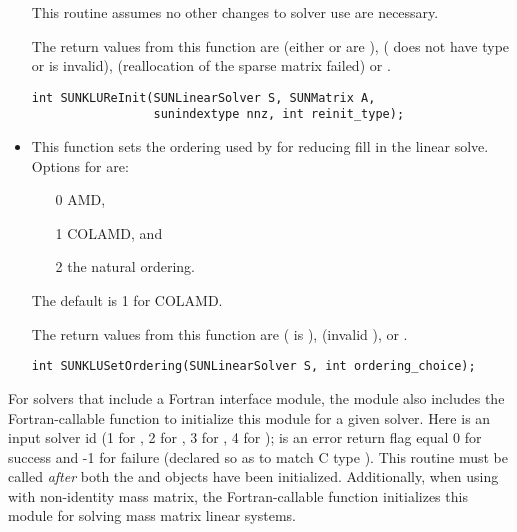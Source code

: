 \begin{itemize}
  This routine assumes no other changes to solver use are necessary.

  The return values from this function are 
  (either  or  are ), 
  ( does not have type  or
   is invalid),  (reallocation
  of the sparse matrix failed) or .
  
\begin{verbatim}
int SUNKLUReInit(SUNLinearSolver S, SUNMatrix A, 
                 sunindextype nnz, int reinit_type);
\end{verbatim}



\item {}

  This function sets the ordering used by {\klu} for reducing fill in
  the linear solve.  Options for  are:
  \begin{itemize}
  \item[0] AMD,
  \item[1] COLAMD, and
  \item[2] the natural ordering.
  \end{itemize}
  The default is 1 for COLAMD.

  The return values from this function are 
  ( is ), 
  (invalid ), or .
  
  \verb|int SUNKLUSetOrdering(SUNLinearSolver S, int ordering_choice);|

\end{itemize}
For solvers that include a Fortran interface module, the
{\sunlinsolklu} module also includes the Fortran-callable
function  to initialize this
{\sunlinsolklu} module for a given {\sundials} solver.  Here 
is an input solver id (1 for {\cvode}, 2 for {\ida}, 3 for {\kinsol},
4 for {\arkode});  is an error return flag equal 0 for success
and -1 for failure (declared so as to match C type ).  This
routine must be called \emph{after} both the {\nvector} and
{\sunmatrix} objects have been initialized.  Additionally, when using
{\arkode} with non-identity mass matrix, the Fortran-callable function
 initializes this {\sunlinsolklu} module for
solving mass matrix linear systems.

